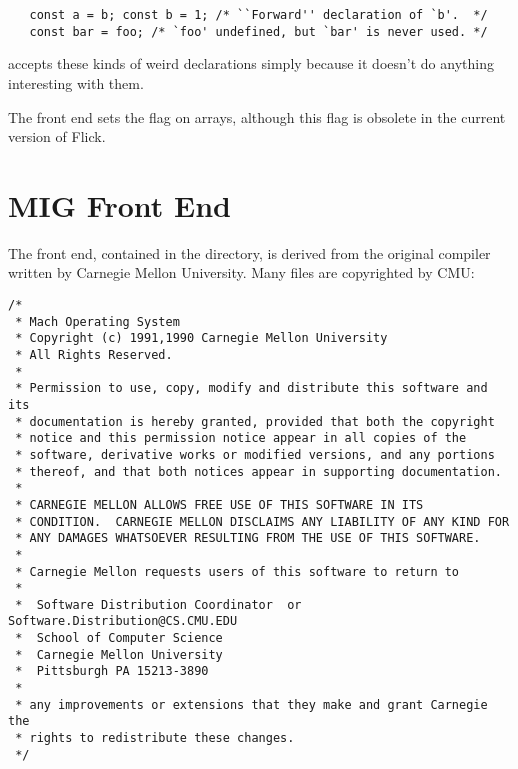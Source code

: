 {\begin{description}
\begin{verbatim}
   const a = b; const b = 1; /* ``Forward'' declaration of `b'.  */
   const bar = foo; /* `foo' undefined, but `bar' is never used. */
\end{verbatim}

  \rpcgen{} accepts these kinds of weird declarations simply because it doesn't
  do anything interesting with them.

  \item[\idl{opaque} Array Flags.]
  The front end sets the  flag on
   arrays, although this flag is obsolete in the current version of
  Flick.
\end{description}



\section{MIG Front End}
\label{sec:FE:MIG Front End}

The \MIG{} front end, contained in the  directory, is derived
from the original \MIG{} \IDL{} compiler written by Carnegie Mellon University.
Many files are copyrighted by CMU:


\begin{verbatim}
/*
 * Mach Operating System
 * Copyright (c) 1991,1990 Carnegie Mellon University
 * All Rights Reserved.
 *
 * Permission to use, copy, modify and distribute this software and its
 * documentation is hereby granted, provided that both the copyright
 * notice and this permission notice appear in all copies of the
 * software, derivative works or modified versions, and any portions
 * thereof, and that both notices appear in supporting documentation.
 *
 * CARNEGIE MELLON ALLOWS FREE USE OF THIS SOFTWARE IN ITS
 * CONDITION.  CARNEGIE MELLON DISCLAIMS ANY LIABILITY OF ANY KIND FOR
 * ANY DAMAGES WHATSOEVER RESULTING FROM THE USE OF THIS SOFTWARE.
 *
 * Carnegie Mellon requests users of this software to return to
 *
 *  Software Distribution Coordinator  or  Software.Distribution@CS.CMU.EDU
 *  School of Computer Science
 *  Carnegie Mellon University
 *  Pittsburgh PA 15213-3890
 *
 * any improvements or extensions that they make and grant Carnegie the
 * rights to redistribute these changes.
 */
\end{verbatim}

}
